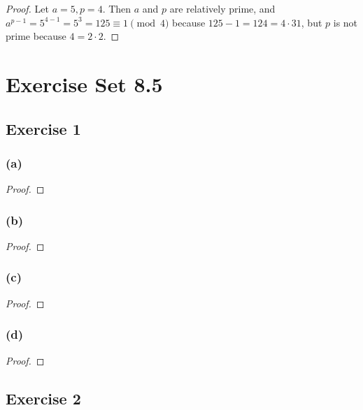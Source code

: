 \documentclass[14pt]{extarticle}
\begin{document}
\begin{proof}
Let \(a = 5, p = 4\). Then $a$ and $p$ are relatively prime, and \(a^{p-1} = 5^{4-1}=5^3 = 125 \equiv 1 \pmod 4\)
because \(125 - 1 = 124 = 4 \cdot 31\), but $p$ is not prime because \(4 = 2 \cdot 2\).
\end{proof}

\section{Exercise Set 8.5}

\subsection{Exercise 1}

\subsubsection{(a)}

\begin{proof}

\end{proof}

\subsubsection{(b)}

\begin{proof}

\end{proof}

\subsubsection{(c)}

\begin{proof}

\end{proof}

\subsubsection{(d)}

\begin{proof}

\end{proof}

\subsection{Exercise 2}
\end{document}
